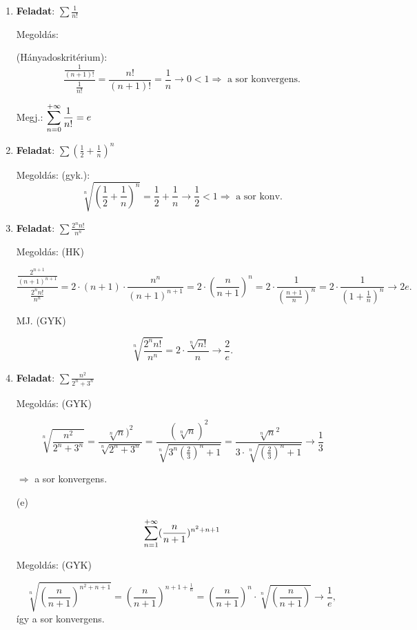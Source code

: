 \documentclass[a4paper,11.5pt]{article}
\begin{document}
	\begin{enumerate}
	\bigskip
	\item \textbf{Feladat}: $\displaystyle\sum \frac{1}{n!}$
	
	\medskip
	Megoldás:
	
	(Hányadoskritérium): \[\frac{\displaystyle\frac{1}{(n+1)!}}{\displaystyle\frac{1}{n!}}=\frac{n!}{(n+1)!}=\frac{1}{n}\rightarrow 0<1 \Rightarrow\text{ a sor konvergens.}\]
	
	\medskip 
	Megj.: $\displaystyle\sum_{n=0}^{+\infty} \frac{1}{n!}=e$
	
	\bigskip
	\item\textbf{Feladat}: $\displaystyle\sum \left(\frac{1}{2}+\frac{1}{n}\right)^n$
	
	\medskip
	Megoldás: (gyk.):  \[\sqrt[n]{(\frac{1}{2}+\frac{1}{n})^n}=\frac{1}{2}+\frac{1}{n}\longrightarrow \frac{1}{2}<1 \Rightarrow\text{ a sor konv.}\]
	
	\bigskip
	
	\item\textbf{Feladat}: $\displaystyle\sum \frac{2^nn!}{n^n}$
	
	\medskip
	Megoldás: (HK)
	
	\[\frac{\displaystyle\frac{2^{n+1}}{(n+1)^{n+1}}}{\displaystyle\frac{2^nn!}{n^n}}=2\cdot(n+1)\cdot\frac{n^n}{(n+1)^{n+1}}=2\cdot\left(\frac{n}{n+1}\right)^n=2\cdot\frac{1}{(\frac{n+1}{n})^n}=2\cdot \frac{1}{(1+\frac{1}{n})^n} \longrightarrow 2e.\] 
	
	\bigskip
	MJ. (GYK)
	
	\[\sqrt[n]{\frac{2^nn!}{n^n}}=2\cdot\frac{\sqrt[n]{n!}}{n} \longrightarrow \frac{2}{e}.\]
	
		\bigskip
	\item\textbf{Feladat}: $\displaystyle\sum \frac{n^2}{2^n+3^n}$
	
	\medskip
	Megoldás: (GYK)
	
	\[\sqrt[n]{\frac{n^2}{2^n+3^n}}=\frac{\sqrt[n]{n})^2}{\sqrt[n]{2^n+3^n}}= \frac{(\sqrt[n]{n})^2}{\sqrt[n]{3^n\left(\frac{2}{3}\right)^n+1}}=\frac{\sqrt[n]{n}^2}{3\cdot\sqrt[n]{\left(\frac{2}{3}\right)^n+1}} \longrightarrow \frac{1}{3}\]
	
	$\Rightarrow $ a sor konvergens.
	
	(e)
	
	\[\sum_{n=1}^{+\infty} (\frac{n}{n+1})^{n^2+n+1}\]
	
	Megoldás:
	(GYK)
	
	\[\sqrt[n]{\left(\frac{n}{n+1}\right)^{n^2+n+1}}=\left(\frac{n}{n+1}\right)^{n+1+\frac{1}{n}}=\left(\frac{n}{n+1}\right)^n\cdot\sqrt[n]{\left(\frac{n}{n+1}\right)} \longrightarrow \frac{1}{e},\] így a sor konvergens.
	
	
	
	\bigskip
\end{enumerate}
\end{document}
